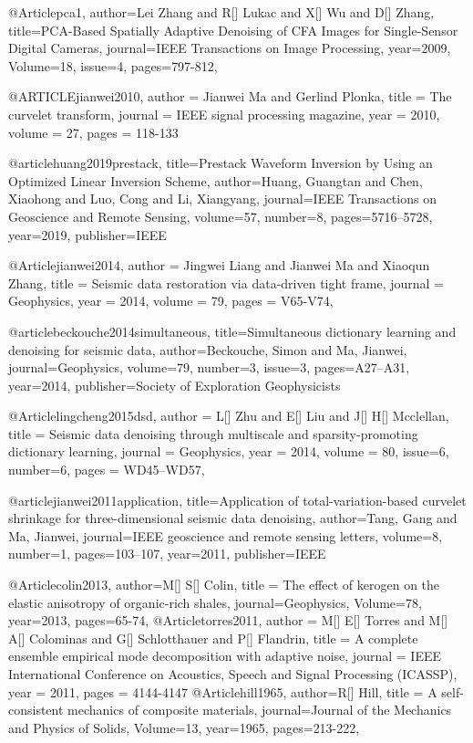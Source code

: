@Article{pca1,
  author={Lei Zhang and R[] Lukac and X[] Wu and D[] Zhang},
  title={PCA-Based Spatially Adaptive Denoising of {CFA} Images for Single-Sensor Digital Cameras},
  journal={IEEE Transactions on Image Processing},
  year=2009,
  Volume=18,
  issue=4,
  pages={797-812},
}

@ARTICLE{jianwei2010,
  author = {Jianwei Ma and Gerlind Plonka},
  title = {The curvelet transform},
  journal = {IEEE signal processing magazine},
  year = {2010},
  volume = {27},
  pages = {118-133}
}

@article{huang2019prestack,
  title={Prestack Waveform Inversion by Using an Optimized Linear Inversion Scheme},
  author={Huang, Guangtan and Chen, Xiaohong and Luo, Cong and Li, Xiangyang},
  journal={IEEE Transactions on Geoscience and Remote Sensing},
  volume={57},
  number={8},
  pages={5716--5728},
  year={2019},
  publisher={IEEE}
}

@Article{jianwei2014,
  author = 	 {Jingwei Liang and Jianwei Ma and Xiaoqun Zhang},
  title = 	 {Seismic data restoration via data-driven tight frame},
  journal = 	 {Geophysics},
  year = 	 2014,
  volume =	 79,
  pages =	 {V65-V74},
}

@article{beckouche2014simultaneous,
  title={Simultaneous dictionary learning and denoising for seismic data},
  author={Beckouche, Simon and Ma, Jianwei},
  journal={Geophysics},
  volume={79},
  number={3},
  issue=3,
  pages={A27--A31},
  year={2014},
  publisher={Society of Exploration Geophysicists}
}

@Article{lingcheng2015dsd,
  author = 	 {L[] Zhu and E[] Liu and J[] H[] Mcclellan},
  title = 	 {Seismic data denoising through multiscale and sparsity-promoting dictionary learning},
  journal = 	 {Geophysics},
  year = 	 2014,
  volume =	 80,
  issue=6,
  number=6,
  pages =	 {WD45–WD57},
}





@article{jianwei2011application,
  title={Application of total-variation-based curvelet shrinkage for three-dimensional seismic data denoising},
  author={Tang, Gang and Ma, Jianwei},
  journal={IEEE geoscience and remote sensing letters},
  volume={8},
  number={1},
  pages={103--107},
  year={2011},
  publisher={IEEE}
}

@Article{colin2013,
  author={M[] S[] Colin},
  title = {The effect of kerogen on the elastic anisotropy of organic-rich shales},
  journal={Geophysics},
  Volume=78,
  year=2013,
  pages={65-74},
}
@Article{torres2011,
  author = 	 {M[] E[] Torres and M[] A[] Colominas and G[] Schlotthauer and P[] Flandrin},
  title = 	 {A complete ensemble empirical mode decomposition with adaptive noise},
  journal = 	 {IEEE International Conference on Acoustics, Speech and Signal Processing (ICASSP)},
  year = 	 2011,
  pages = 	 {4144-4147}
}
@Article{hill1965,
  author={R[] Hill},
  title = {A self-consistent mechanics of composite materials},
  journal={Journal of the Mechanics and Physics of Solids},
  Volume=13,
  year=1965,
  pages={213-222},
}

